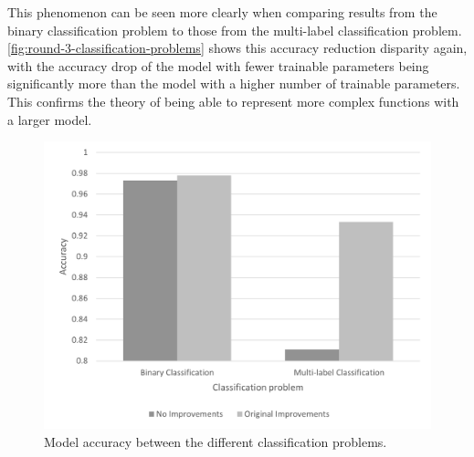 This phenomenon can be seen more clearly when comparing results from the binary classification problem to those from the multi-label classification problem. \autoref{fig:round-3-classification-problems} shows this accuracy reduction disparity again, with the accuracy drop of the model with fewer trainable parameters being significantly more than the model with a higher number of trainable parameters. This confirms the theory of being able to represent more complex functions with a larger model.

\begin{figure}[H]
    \centering
    \includegraphics[width=\textwidth]{figures/round-3-classification-problems.png}
    \caption{Model accuracy between the different classification problems.}
    \label{fig:round-3-classification-problems}
\end{figure}